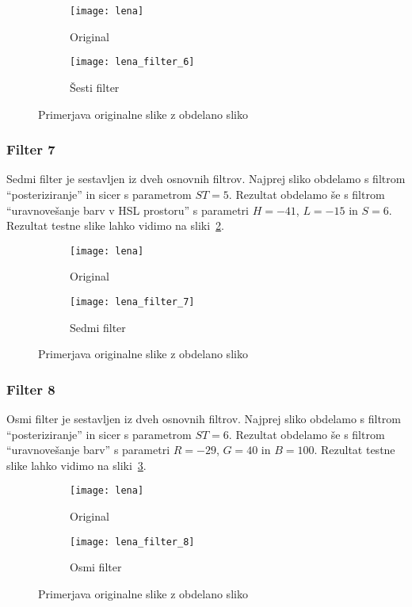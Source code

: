 \begin{figure}[h]
    \centering
    \begin{subfigure}[b]{0.4\textwidth}
        \texttt{[image: lena]}
        \caption{Original}
    \end{subfigure}
    \begin{subfigure}[b]{0.4\textwidth}
        \texttt{[image: lena\_filter\_6]}
        \caption{Šesti filter}
    \end{subfigure}
    \caption{Primerjava originalne slike z obdelano sliko}
    \label{fig:lena_filter_6}
\end{figure}


\subsubsection*{Filter 7}
Sedmi filter je sestavljen iz dveh osnovnih filtrov. Najprej sliko obdelamo s
filtrom ``posteriziranje'' in sicer s parametrom $ST = 5$. Rezultat obdelamo
še s filtrom ``uravnovešanje barv v HSL prostoru'' s parametri $H = -41$,
$L = -15$ in $S = 6$. Rezultat testne slike lahko vidimo na
sliki~\ref{fig:lena_filter_7}.

\begin{figure}[h]
    \centering
    \begin{subfigure}[b]{0.4\textwidth}
        \texttt{[image: lena]}
        \caption{Original}
    \end{subfigure}
    \begin{subfigure}[b]{0.4\textwidth}
        \texttt{[image: lena\_filter\_7]}
        \caption{Sedmi filter}
    \end{subfigure}
    \caption{Primerjava originalne slike z obdelano sliko}
    \label{fig:lena_filter_7}
\end{figure}


\subsubsection*{Filter 8}
Osmi filter je sestavljen iz dveh osnovnih filtrov. Najprej sliko obdelamo s
filtrom ``posteriziranje'' in sicer s parametrom $ST = 6$. Rezultat obdelamo
še s filtrom ``uravnovešanje barv'' s parametri $R = -29$, $G = 40$ in $B = 100$.
Rezultat testne slike lahko vidimo na sliki~\ref{fig:lena_filter_8}.

\begin{figure}[h]
    \centering
    \begin{subfigure}[b]{0.4\textwidth}
        \texttt{[image: lena]}
        \caption{Original}
    \end{subfigure}
    \begin{subfigure}[b]{0.4\textwidth}
        \texttt{[image: lena\_filter\_8]}
        \caption{Osmi filter}
    \end{subfigure}
    \caption{Primerjava originalne slike z obdelano sliko}
    \label{fig:lena_filter_8}
\end{figure}


